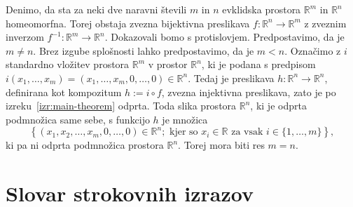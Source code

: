 \documentclass[mat1]{fmfdelo}
\newcommand{\literatura}{literatura}  %
\newcommand{\R}{\mathbb R}
\newcommand{\0}{0}
\begin{document}
\begin{dokaz}
Denimo, da sta za neki dve naravni števili $m$ in $n$ evklidska prostora $\R^m$ in $\R^n$ homeomorfna. Torej obstaja zvezna bijektivna preslikava $f : \R^n \to \R^m$ z zveznim inverzom $f^{-1} : \R^m \to \R^n$. Dokazovali bomo s protislovjem. Predpostavimo, da je $m \neq n$. Brez izgube splošnosti lahko predpostavimo, da je $m < n$. 
Označimo z $i$ standardno vložitev prostora ${\mathbb R}^m$ v prostor ${\mathbb R}^n$, ki je podana s predpisom $i(x_1, \dots, x_m) = (x_1, \dots, x_m, 0, \dots, 0) \in \R^n$. Tedaj je preslikava $h : \R^n \to \R^n$, definirana kot kompozitum $h := i \circ f$, zvezna injektivna preslikava, zato je po izreku~\ref{izr:main-theorem} odprta. Toda slika prostora $\R^n$, ki je odprta podmnožica same sebe, s funkcijo $h$ je množica 
$$\left \{ (x_1, x_2, \dots, x_m, 0, \dots, 0) \in \R^n ; \text{ kjer so } x_i \in \R \text{ za vsak } i \in \{1, \dots, m \}  \right \},$$
 ki pa ni odprta podmnožica prostora $\R^n$. Torej mora biti res $m = n$.
\end{dokaz}
\section*{Slovar strokovnih izrazov}



        
\end{document}
